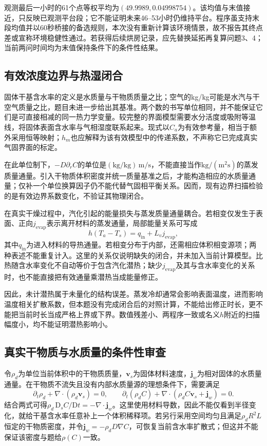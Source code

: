 \documentclass[UTF8,zihao=-4,a4paper]{ctexart}
\begin{document}
观测最后一小时的61个点等权平均为$(49.9989,0.04998754)$。该均值与末值接近，只反映已观测平台段；它不能证明未来46--53小时仍维持平台。程序虽支持末段均值并以60秒桥接的备选规则，本次没有重新计算该环境情景，故不报告其终点差或宣称环境稳健性通过。若获得后续烘房记录，应先替换延拓再复算问题3、4；当前两问时间均为末值保持条件下的条件性结果。

\subsection{有效浓度边界与热湿闭合}
固体干基含水率的定义是水质量与干物质质量之比；空气的kg/kg可能是水汽与干空气质量之比，题目未进一步给出其基准。两个数的书写单位相同，并不能保证它们是可直接相减的同一热力学变量。较完整的界面模型需要水分活度或吸附等温线，将固体表面含水率与气相湿度联系起来\cite{comsol_sorption,comsol_air}。现式以$C_a$为有效参考量，相当于额外采用恒等映射；$h_m$也应解释为该有效模型中的传递系数，不声称它已完成真实气固界面的标定。

在此单位制下，$-D\partial_r C$的单位是$(\mathrm{kg/kg})\,\mathrm{m/s}$，不能直接当作$\mathrm{kg/(m^2s)}$的蒸发质量通量。引入干物质体积密度并统一质量基准之后，才能构造相应的水质量通量；仅补一个单位换算因子仍不能代替气固相平衡关系。因而，现有边界扫描检验的是有效边界系数变化，不验证其物理闭合。

在真实干燥过程中，汽化引起的能量损失与蒸发质量通量耦合。若相变仅发生于表面、正向$j_{\mathrm{evap}}$表示离开材料的蒸发通量，局部能量关系可写成
\begin{equation}
h(T_a-T_s)=q_{\mathrm{in}}+L_vj_{\mathrm{evap}},
\end{equation}
其中$q_{\mathrm{in}}$为进入材料的导热通量。若相变分布于内部，还需相应体积相变源项；两种表述不能重复计入\cite{comsol_latent}。这里的关系仅说明缺失的闭合，并未加入当前计算模型。比热随含水率变化不自动等价于包含汽化潜热；缺少$j_{\mathrm{evap}}$及其与含水率变化的关系时，也不能直接把有效通量乘潜热当成能量修正。

因此，未计潜热属于未量化的结构误差。蒸发冷却通常会影响表面温度，进而影响温度相关扩散系数，但本题没有完成闭合后的对照计算，不能给出修正时长，更不能把当前时长当成严格上界或下界。数值残差小、两程序一致或名义$h$附近的扫描幅度小，均不能证明潜热影响小。

\subsection{真实干物质与水质量的条件性审查}
令$\rho_d$为单位当前体积中的干物质质量，$\boldsymbol v_s$为固体材料速度，$\boldsymbol j_w$为相对固体的水质量通量。在干物质不流失且没有内部水质量源的理想条件下，需要满足
\begin{equation}
\partial_t\rho_d+\nabla\!\cdot(\rho_d\boldsymbol v_s)=0,\qquad
\partial_t(\rho_d C)+\nabla\!\cdot(\rho_d C\boldsymbol v_s+\boldsymbol j_w)=0.
\end{equation}
结合两式可得$\rho_d\,\mathrm D_sC/\mathrm Dt=-\nabla\!\cdot\boldsymbol j_w$。这里使用材料导数，因此不能仅看到半径变化，就给干基含水率任意补上一个体积稀释项。若另行采用空间均匀且满足$\rho_dR^2L$恒定的干物质密度，并令$\boldsymbol j_w=-\rho_dD\nabla C$，可恢复当前含水率扩散式；但这并不能保证该密度与题给$\rho(C)$一致。
\end{document}

